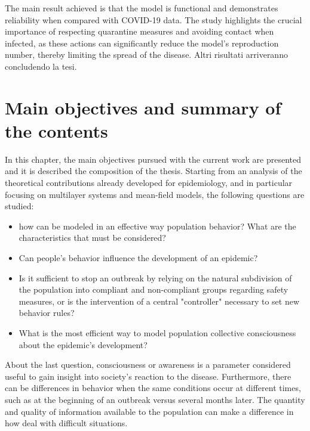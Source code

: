 The main result achieved is that the model is functional and demonstrates reliability when compared with COVID-19 data. The study highlights the crucial importance of respecting quarantine measures and avoiding contact when infected, as these actions can significantly reduce the model's reproduction number, thereby limiting the spread of the disease. Altri risultati arriveranno concludendo la tesi.

\chapter{Main objectives and summary of the contents}

In this chapter, the main objectives pursued with the current work are presented and it is described the composition of the thesis. 
Starting from an analysis of the theoretical contributions already developed for epidemiology, and in particular focusing on multilayer systems and mean-field models, the following questions are studied:

\begin{itemize}
	\item how can be modeled in an effective way population behavior? What are the characteristics that must be considered?
	\item Can people's behavior influence the development of an epidemic?
	\item Is it sufficient to stop an outbreak by relying on the natural subdivision of the population into compliant and non-compliant groups regarding safety measures, or is the intervention of a central "controller" necessary to set new behavior rules?
	\item What is the most efficient way to model population collective consciousness about the epidemic's development? 
\end{itemize}
About the last question, consciousness or awareness is a parameter considered useful to gain insight into society's reaction to the disease. Furthermore, there can be differences in behavior when the same conditions occur at different times, such as at the beginning of an outbreak versus several months later. The quantity and quality of information available to the population can make a difference in how deal with difficult situations.

